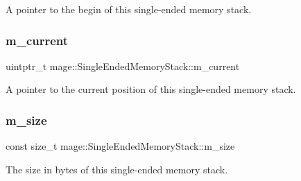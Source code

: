 A pointer to the begin of this single-\/ended memory stack. \hypertarget{classmage_1_1_single_ended_memory_stack_a78785ecceac6ce271658864dac80e84b}{}\label{classmage_1_1_single_ended_memory_stack_a78785ecceac6ce271658864dac80e84b} 
\subsubsection{\texorpdfstring{m\+\_\+current}{m\_current}}
{\footnotesize\ttfamily uintptr\+\_\+t mage\+::\+Single\+Ended\+Memory\+Stack\+::m\+\_\+current\hspace{0.3cm}{\ttfamily [private]}}

A pointer to the current position of this single-\/ended memory stack. \hypertarget{classmage_1_1_single_ended_memory_stack_a3766c742087068479c3e324280ca94bf}{}\label{classmage_1_1_single_ended_memory_stack_a3766c742087068479c3e324280ca94bf} 
\subsubsection{\texorpdfstring{m\+\_\+size}{m\_size}}
{\footnotesize\ttfamily const size\+\_\+t mage\+::\+Single\+Ended\+Memory\+Stack\+::m\+\_\+size\hspace{0.3cm}{\ttfamily [private]}}

The size in bytes of this single-\/ended memory stack. 